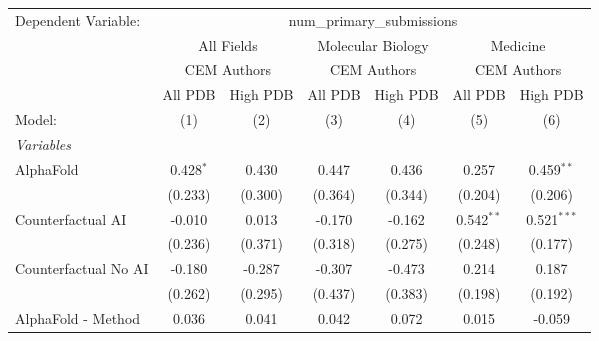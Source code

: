 \begingroup
\centering
\begin{tabular}{lcccccc}
   \tabularnewline \midrule \midrule
   Dependent Variable: & \multicolumn{6}{c}{num\_primary\_submissions}\\
 & \multicolumn{2}{c}{All Fields} & \multicolumn{2}{c}{Molecular Biology} & \multicolumn{2}{c}{Medicine} \\
\cmidrule(lr){2-3} \cmidrule(lr){4-5} \cmidrule(lr){6-7}
 & \multicolumn{2}{c}{CEM Authors} & \multicolumn{2}{c}{CEM Authors} & \multicolumn{2}{c}{CEM Authors} \\
\cmidrule(lr){2-3} \cmidrule(lr){4-5} \cmidrule(lr){6-7}
 & \multicolumn{1}{c}{All PDB} & \multicolumn{1}{c}{High PDB} & \multicolumn{1}{c}{All PDB} & \multicolumn{1}{c}{High PDB} & \multicolumn{1}{c}{All PDB} & \multicolumn{1}{c}{High PDB} \\
\cmidrule(lr){2-2} \cmidrule(lr){3-3} \cmidrule(lr){4-4} \cmidrule(lr){5-5} \cmidrule(lr){6-6} \cmidrule(lr){7-7}
   Model:                                                     & (1)            & (2)          & (3)          & (4)            & (5)           & (6)\\  
   \midrule
   \emph{Variables}\\
   AlphaFold                                                  & 0.428$^{*}$    & 0.430        & 0.447        & 0.436          & 0.257         & 0.459$^{**}$\\   
                                                              & (0.233)        & (0.300)      & (0.364)      & (0.344)        & (0.204)       & (0.206)\\   
   Counterfactual AI                                          & -0.010         & 0.013        & -0.170       & -0.162         & 0.542$^{**}$  & 0.521$^{***}$\\   
                                                              & (0.236)        & (0.371)      & (0.318)      & (0.275)        & (0.248)       & (0.177)\\   
   Counterfactual No AI                                       & -0.180         & -0.287       & -0.307       & -0.473         & 0.214         & 0.187\\   
                                                              & (0.262)        & (0.295)      & (0.437)      & (0.383)        & (0.198)       & (0.192)\\   
   AlphaFold - Method                                         & 0.036          & 0.041        & 0.042        & 0.072          & 0.015         & -0.059\\   

\end{tabular}

